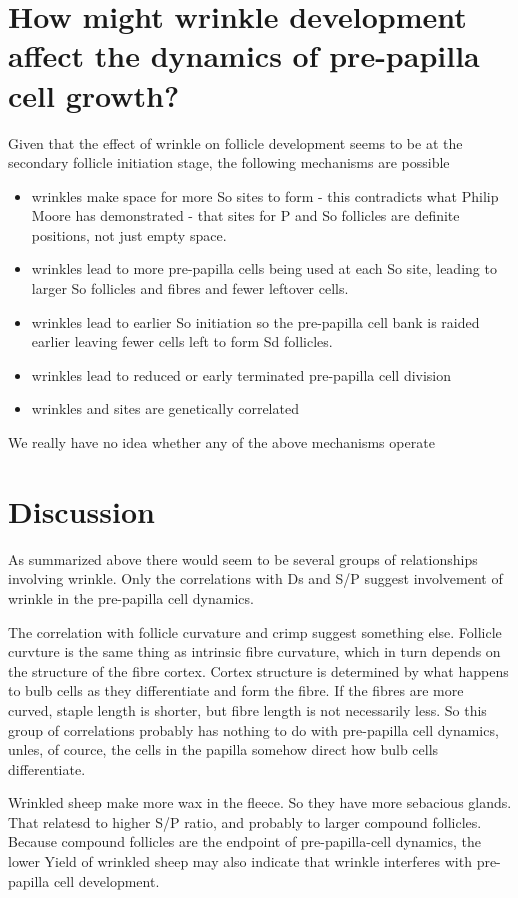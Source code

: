 \documentclass[titlepage]{article}  %
\begin{document}
\section{How might wrinkle development affect the dynamics of pre-papilla cell growth?}
Given that the effect of wrinkle on follicle development seems to be at the secondary follicle initiation stage, the following mechanisms are possible
\begin{itemize}
\item wrinkles make space for more So sites to form - this contradicts what Philip Moore has demonstrated - that sites for P and So follicles are definite positions, not just empty space.
\item wrinkles lead to more pre-papilla cells being used at each So site, leading to larger So follicles and fibres and fewer leftover cells.
\item wrinkles lead to earlier So initiation so the pre-papilla cell bank is raided earlier leaving fewer cells left to form Sd follicles.
\item wrinkles lead to reduced or early terminated pre-papilla cell division
\item wrinkles and sites are genetically correlated
\end{itemize}

We really have no idea whether any of the above mechanisms operate

\section{Discussion}
As summarized above there would seem to be several groups of relationships involving wrinkle. Only the correlations with Ds and S/P suggest involvement of wrinkle in the pre-papilla cell dynamics. 

The correlation with follicle curvature and crimp suggest something else. Follicle curvture is the same thing as intrinsic fibre curvature, which in turn depends on the structure of the fibre cortex. Cortex structure is determined by what happens to bulb cells as they differentiate and form the fibre. If the fibres are more curved, staple length is shorter, but fibre length is not necessarily less. So this group of correlations probably has nothing to do with pre-papilla cell dynamics, unles, of cource, the cells in the papilla somehow direct how bulb cells differentiate.

Wrinkled sheep make more wax in the fleece. So they have more sebacious glands. That relatesd to higher S/P ratio, and probably to larger compound follicles. Because compound follicles are the endpoint of pre-papilla-cell dynamics, the  lower Yield of wrinkled sheep may also indicate that wrinkle interferes with pre-papilla cell development.
\end{document}
